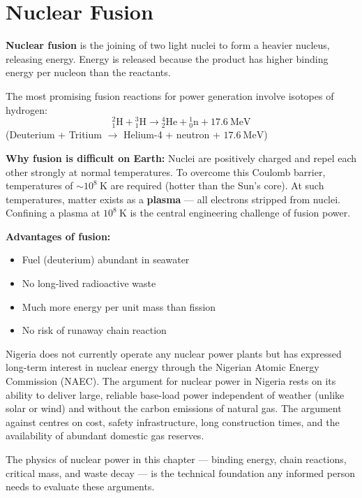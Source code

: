 \section{Nuclear Fusion}

\begin{definitionbox}
\textbf{Nuclear fusion} is the joining of two light
nuclei to form a heavier nucleus, releasing energy.
Energy is released because the product has higher
binding energy per nucleon than the reactants.

The most promising fusion reactions for power
generation involve isotopes of hydrogen:
\[
  {}^2_1\text{H} + {}^3_1\text{H}
  \rightarrow {}^4_2\text{He} + {}^1_0\text{n}
  + 17.6\ \text{MeV}
\]
(Deuterium + Tritium $\rightarrow$ Helium-4
+ neutron + $17.6\ \text{MeV}$)

\textbf{Why fusion is difficult on Earth:}
Nuclei are positively charged and repel each other
strongly at normal temperatures. To overcome this
Coulomb barrier, temperatures of $\sim 10^8\ \text{K}$
are required (hotter than the Sun's core). At such
temperatures, matter exists as a \textbf{plasma} ---
all electrons stripped from nuclei. Confining a
plasma at $10^8\ \text{K}$ is the central engineering
challenge of fusion power.

\textbf{Advantages of fusion:}
\begin{itemize}[noitemsep]
  \item Fuel (deuterium) abundant in seawater
  \item No long-lived radioactive waste
  \item Much more energy per unit mass than fission
  \item No risk of runaway chain reaction
\end{itemize}
\end{definitionbox}

\begin{realworldbox}
Nigeria does not currently operate any nuclear power
plants but has expressed long-term interest in
nuclear energy through the Nigerian Atomic Energy
Commission (NAEC). The argument for nuclear power
in Nigeria rests on its ability to deliver large,
reliable base-load power independent of weather
(unlike solar or wind) and without the carbon
emissions of natural gas. The argument against
centres on cost, safety infrastructure, long
construction times, and the availability of
abundant domestic gas reserves.

The physics of nuclear power in this chapter ---
binding energy, chain reactions, critical mass, and
waste decay --- is the technical foundation any
informed person needs to evaluate these arguments.
\end{realworldbox}


